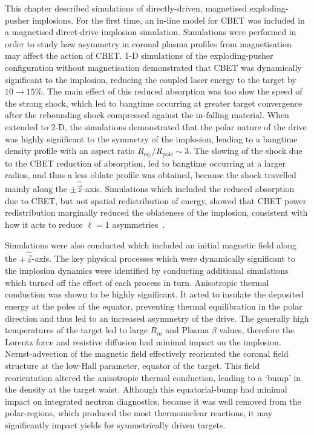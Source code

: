 This chapter described simulations of directly-driven, magnetised exploding-pusher implosions.
For the first time, an in-line model for \ac{CBET} was included in a magnetised direct-drive implosion simulation.
Simulations were performed in order to study how asymmetry in coronal plasma profiles from magnetisation may affect the action of \ac{CBET}.
1-D simulations of the exploding-pusher configuration without magnetisation demonstrated that \ac{CBET} was dynamically significant to the implosion, reducing the coupled laser energy to the target by $10\rightarrow15\%$.
The main effect of this reduced absorption was too slow the speed of the strong shock, which led to bangtime occurring at greater target convergence after the rebounding shock compressed against the in-falling material.
When extended to 2-D, the simulations demonstrated that the polar nature of the drive was highly significant to the symmetry of the implosion, leading to a bangtime density profile with an aspect ratio $R_{\text{eq.}}/R_{\text{pole}}\sim 3$.
The slowing of the shock due to the \ac{CBET} reduction of absorption, led to bangtime occurring at a larger radius, and thus a less oblate profile was obtained, because the shock travelled mainly along the $\pm\hat{\vec{z}}$-axis.
Simulations which included the reduced absorption due to \ac{CBET}, but not spatial redistribution of energy, showed that \ac{CBET} power redistribution marginally reduced the oblateness of the implosion, consistent with how it acts to reduce $\ell=1$ asymmetries~\cite{anderson_effect_2020}.

Simulations were also conducted which included an initial magnetic field along the $+\hat{\vec{z}}$-axis.
The key physical processes which were dynamically significant to the implosion dynamics were identified by conducting additional simulations which turned off the effect of each process in turn.
Anisotropic thermal conduction was shown to be highly significant.
It acted to insulate the deposited energy at the poles of the equator, preventing thermal equilibration in the polar direction and thus led to an increased asymmetry of the drive.
The generally high temperatures of the target led to large $R_m$ and Plasma $\beta$ values, therefore the Lorentz force and resistive diffusion had minimal impact on the implosion.
Nernst-advection of the magnetic field effectively reoriented the coronal field structure at the low-Hall parameter, equator of the target.
This field reorientation altered the anisotropic thermal conduction, leading to a `bump' in the density at the target waist.
Although this equatorial-bump had minimal impact on integrated neutron diagnostics, because it was well removed from the polar-regions, which produced the most thermonuclear reactions, it may significantly impact yields for symmetrically driven targets.

